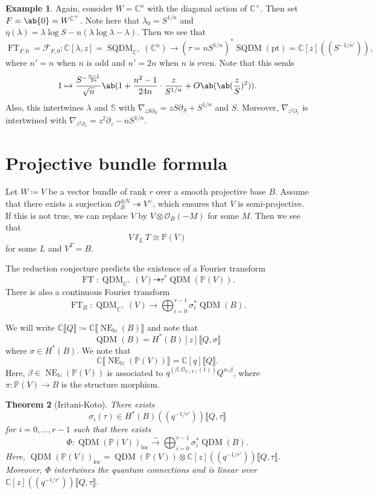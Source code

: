 \documentclass{amsart}
\newtheorem{thm}{Theorem}[section]
\theoremstyle{definition}
\newtheorem{exm}[thm]{Example}
\theoremstyle{remark}
\theoremstyle{plain}
\theoremstyle{definition}
\theoremstyle{remark}
\newcommand{\N}{\mathbb{N}}
\newcommand{\C}{\mathbb{C}}
\newcommand{\bS}{\mathbb{S}}
\renewcommand{\P}{\mathbb{P}}
\renewcommand{\mc}[1]{\mathcal{#1}}
\newcommand{\mr}[1]{\mathrm{#1}}
\newcommand{\on}[1]{\operatorname{#1}}
\newcommand{\1}{\mathbf{1}}
\newcommand{\2}{\mathbf{2}}
\newcommand{\3}{\mathbf{3}}
\newcommand{\ps}[1]{\lBrack #1 \rBrack}
\newcommand{\ls}[1]{(\!( #1 )\!)}
\DeclareMathOperator{\QDM}{QDM}
\DeclareMathOperator{\SQDM}{SQDM}
\DeclareMathOperator{\FT}{FT}
\begin{document}
\begin{exm}
    Again, consider \(W = \C^n\) with the diagonal action of \(\C^{\times}\). Then set \(F = \ab\{0\} = W^{\C^{\times}}\). Note here that \(\lambda_0 = S^{1/n}\) and \(\eta(\lambda) = \lambda \log S - n (\lambda \log \lambda - \lambda)\). Then we see that
    \[ \FT_{F, 0} = \mc{F}_{F, 0} \colon \C[\lambda, z] = \SQDM_{\C^{\times}}(\C^n) \to (\tau = n S^{1/n})^* \SQDM(\mr{pt}) = \C[z]\ls{S^{-1/n'}}, \] 
    where \(n' = n\) when \(n\) is odd and \(n' = 2n\) when \(n\) is even. Note that this sends
    \[ 1 \mapsto \frac{S^{-\frac{n-1}{2n}}}{\sqrt{n}} \ab(1 + \frac{n^2-1}{24n} \cdot \frac{z}{S^{1/n}} + O \ab( \ab(\frac{z}{S})^2)). \]
    Also, this intertwines \(\lambda\) and \(\bS\) with \(\nabla_{z S \partial_S} = z S \partial_S + S^{1/n}\) and \(S\). Moreover, \(\nabla_{z^2 \partial_z}\) is intertwined with \(\nabla_{z^2 \partial_z} = z^2 \partial_z - n S^{1/n}\).
\end{exm}


\section{Projective bundle formula}%
\label{sec:Projective bundle formula}

Let \(W \coloneqq V\) be a vector bundle of rank \(r\) over a smooth projective base \(B\). Assume that there exists a surjection \(\mc{O}_B^{\oplus N} \twoheadrightarrow V^{\vee}\), which ensures that \(V\) is semi-projective. If this is not true, we can replace \(V\) by \(V \otimes \mc{O}_B(-M)\) for some \(M\). Then we see that
\[ V \sslash_L T \cong \P(V) \]
for some \(L\) and \(V^T = B\).

The reduction conjecture predicts the existence of a Fourier transform
\[ \FT \colon \QDM_{\C^{\times}}(V) \dashrightarrow \tau^* \QDM(\P(V)). \]
There is also a continuous Fourier transform
\[ \FT_B \colon \QDM_{\C^{\times}}(V) \to \bigoplus_{i=0}^{r-1} \sigma_i^* \QDM(B). \]

We will write \(\C \ps{Q} \coloneqq \C \ps{\on{NE}_{\N}(B)}\) and note that
\[ \QDM(B) = H^*(B)[z] \ps{Q, \sigma} \]
where \(\sigma \in H^*(B)\). We note that 
\[ \C\ps{\on{NE}_{\N}(\P(V))} = \C[q] \ps{Q}. \]
Here, \(\beta \in \on{NE}_{\N}(\P(V))\) is associated to \(q^{(\beta, \mc{O}_{\P(V)}(1))} Q^{\pi_* \beta}\), where \(\pi \colon \P(V) \to B\) is the structure morphism.

\begin{thm}[Iritani-Koto]
    There exists 
    \[ \sigma_i(\tau) \in H^*(B)\ls{q^{-1/r'}} \ps{Q, \tau} \] 
    for \(i = 0, \ldots, r-1\) such that there exists
    \[ \Phi \colon \QDM(\P(V))_{\mr{loc}} \xrightarrow{\sim} \bigoplus_{i=0}^{r-1} \sigma_i^* \QDM(B). \]
    Here, \(\QDM(\P(V))_{\mr{loc}} = \QDM(\P(V)) \otimes \C[z]\ls{q^{-1/r'}} \ps{Q,\tau}\). Moreover, \(\Phi\) intertwines the quantum connections and is linear over \(\C[z]\ls{q^{-1/r'}} \ps{Q,\tau}\).
\end{thm}
\end{document}
